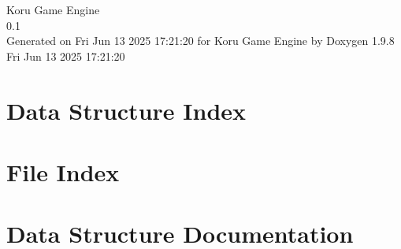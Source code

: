 \documentclass[twoside]{book}
\newcommand{\+}{\discretionary{\mbox{\scriptsize$\hookleftarrow$}}{}{}}
\newcommand{\clearemptydoublepage}{%
    \newpage{\pagestyle{empty}\cleardoublepage}%
  }
\begin{document}
  \raggedbottom
    \hypersetup{pageanchor=false,
                bookmarksnumbered=true,
                pdfencoding=unicode
               }
  \begin{titlepage}
  \vspace*{7cm}
  \begin{center}%
  {\Large Koru Game Engine}\\
  [1ex]\large 0.\+1 \\
  \vspace*{1cm}
  {\large Generated on Fri Jun 13 2025 17\+:21\+:20 for Koru Game Engine by Doxygen 1.9.8}\\
    \vspace*{0.5cm}
    {\small Fri Jun 13 2025 17:21:20}
  \end{center}
  \end{titlepage}
  \clearemptydoublepage
  \tableofcontents
  \clearemptydoublepage
  \hypersetup{pageanchor=true}

\chapter{Data Structure Index}

\chapter{File Index}

\chapter{Data Structure Documentation}

















\end{document}
